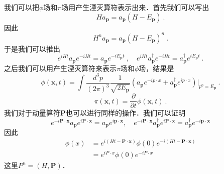 我们可以把$\phi$场和$\pi$场用产生湮灭算符表示出来．首先我们可以写出
\begin{equation}
H a_{\mathbf p} = a_{\mathbf p} (H - E_{\mathbf p})~.
\end{equation}
因此
\begin{equation}
H^n a_{\mathbf p} = a_{\mathbf p} (H - E_{\mathbf p})^n~.
\end{equation}
于是我们可以推出
\begin{equation}
e^{iHt} a_{\mathbf p} e^{-iHt} = a_{\mathbf p} e^{-i E_{\mathbf p}t}~, \quad e^{iHt} a^\dagger_{\mathbf p} e^{-iHt} = a^\dagger_{\mathbf p} e^{iE_{\mathbf p}t} ~.
\end{equation}
之后我们可以用产生湮灭算符来表示$\pi$场和$\phi$场，结果是
\begin{equation}
\phi(\mathbf x,t)= \int \frac{d^3 p }{(2\pi)^3} \frac{1}{\sqrt{2E_{\mathbf p}}} (a_{\mathbf p} e^{-i p \cdot x} + a^\dagger_{\mathbf p} e^{i p \cdot x}) \bigg|_{p^0 = E_{\mathbf p}}~.
\end{equation}
\begin{equation}
\pi(\mathbf x, t) = \frac{\partial}{\partial t} \phi(\mathbf x, t)~.
\end{equation}
我们对于动量算符$\mathbf P$也可以进行同样的操作．我们可以证明
\begin{equation}
e^{-i \mathbf{P} \cdot \mathbf{x}} a_{\mathbf{p}} e^{i \mathbf{P} \cdot \mathbf{x}}=a_{\mathbf{p}} e^{i \mathbf{p} \cdot \mathbf{x}}, \quad e^{-i \mathbf{P} \cdot \mathbf{x}} a_{\mathbf{p}}^{\dagger} e^{i \mathbf{P} \cdot \mathbf{x}}=a_{\mathbf{p}}^{\dagger} e^{-i \mathbf{p} \cdot \mathbf{x}}
\end{equation}
因此
\begin{equation}
\begin{aligned}
\phi(x) &=e^{i(H t-\mathbf{P} \cdot \mathbf{x})} \phi(0) e^{-i(H t-\mathbf{P} \cdot \mathbf{x})} \\
&=e^{i P \cdot x} \phi(0) e^{-i P \cdot x}
\end{aligned}
\end{equation}
这里$P^\mu = (H,\mathbf P)$．


